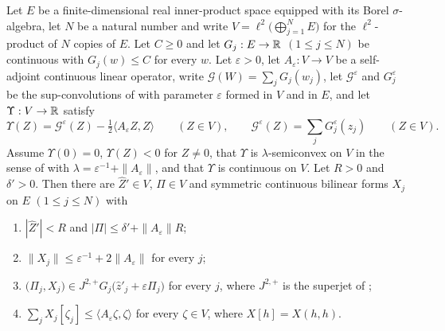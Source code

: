 \begin{lemma}
Let $E$ be a finite-dimensional real inner-product space equipped with its Borel
$\sigma$-algebra, let $N$ be a natural number and write
$V=\ell^2\bigl(\bigoplus_{j=1}^NE\bigr)$ for the $\ell^2$-product of $N$ copies
of $E$. Let $C\ge0$ and let $G_j:E\to\mathbb{R}$ $(1\le j\le N)$ be continuous with
$G_j(w)\le C$ for every $w$. Let $\varepsilon>0$, let $A_\varepsilon:V\to V$ be a
self-adjoint continuous linear operator, write $\mathcal G(W)=\sum_jG_j(w_j)$,
let $\mathcal G^\varepsilon$ and $G_j^\varepsilon$ be the sup-convolutions of
 with parameter $\varepsilon$ formed in $V$ and in $E$,
and let $\Upsilon:V\to\mathbb{R}$ satisfy
\[
  \Upsilon(Z)=\mathcal G^\varepsilon(Z)
    -\tfrac12\langle A_\varepsilon Z,Z\rangle\qquad(Z\in V),
  \qquad
  \mathcal G^\varepsilon(Z)=\sum_jG_j^\varepsilon(z_j)\qquad(Z\in V).
\]
Assume $\Upsilon(0)=0$, $\Upsilon(Z)<0$ for $Z\ne0$, that $\Upsilon$ is
$\lambda$-semiconvex on $V$ in the sense of  with
$\lambda=\varepsilon^{-1}+\|A_\varepsilon\|$, and that $\Upsilon$ is continuous
on $V$. Let $R>0$ and $\delta'>0$. Then there are $\widehat Z'\in V$, $\Pi\in V$
and symmetric continuous bilinear forms $X_j$ on $E$ $(1\le j\le N)$ with
\begin{enumerate}
\item[(J1)] $|\widehat Z'|<R$ and $|\Pi|\le\delta'+\|A_\varepsilon\|R$;
\item[(J2)] $\|X_j\|\le\varepsilon^{-1}+2\|A_\varepsilon\|$ for every $j$;
\item[(J3)] $\bigl(\Pi_j,X_j\bigr)
  \in J^{2,+}G_j\bigl(\widehat z'_j+\varepsilon\Pi_j\bigr)$ for every $j$, where
  $J^{2,+}$ is the superjet of ;
\item[(J4)] $\sum_jX_j[\zeta_j]\le\langle A_\varepsilon\zeta,\zeta\rangle$ for
  every $\zeta\in V$, where $X[h]=X(h,h)$.
\end{enumerate}
\end{lemma}
